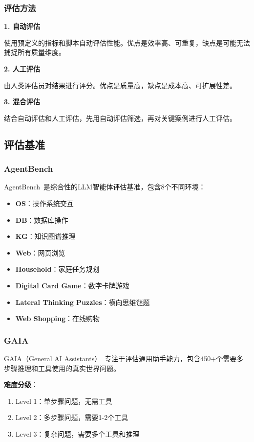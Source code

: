 \subsubsection{评估方法}

\textbf{1. 自动评估}

使用预定义的指标和脚本自动评估性能。优点是效率高、可重复，缺点是可能无法捕捉所有质量维度。

\textbf{2. 人工评估}

由人类评估员对结果进行评分。优点是质量高，缺点是成本高、可扩展性差。

\textbf{3. 混合评估}

结合自动评估和人工评估，先用自动评估筛选，再对关键案例进行人工评估。

\subsection{评估基准}

\subsubsection{AgentBench}

AgentBench~\cite{liu2023agentbench}是综合性的LLM智能体评估基准，包含8个不同环境：

\begin{itemize}[leftmargin=2em]
    \item \textbf{OS}：操作系统交互
    \item \textbf{DB}：数据库操作
    \item \textbf{KG}：知识图谱推理
    \item \textbf{Web}：网页浏览
    \item \textbf{Household}：家庭任务规划
    \item \textbf{Digital Card Game}：数字卡牌游戏
    \item \textbf{Lateral Thinking Puzzles}：横向思维谜题
    \item \textbf{Web Shopping}：在线购物
\end{itemize}

\subsubsection{GAIA}

GAIA（General AI Assistants）~\cite{mialon2023gaia}专注于评估通用助手能力，包含450+个需要多步骤推理和工具使用的真实世界问题。

\textbf{难度分级}：
\begin{enumerate}[leftmargin=2em]
    \item Level 1：单步骤问题，无需工具
    \item Level 2：多步骤问题，需要1-2个工具
    \item Level 3：复杂问题，需要多个工具和推理
\end{enumerate}

